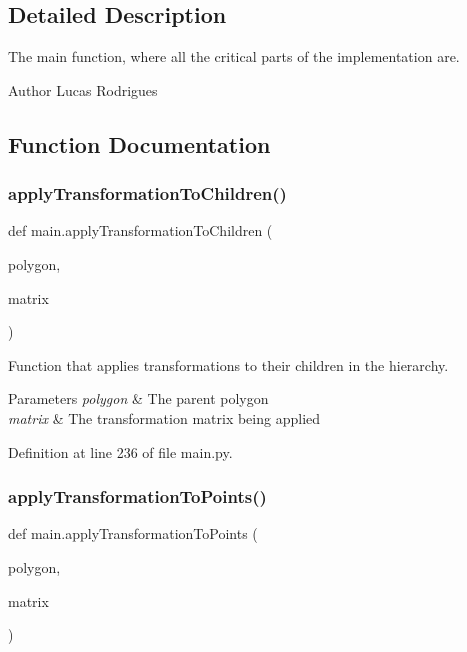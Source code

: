 \subsection{Detailed Description}
The main function, where all the critical parts of the implementation are. 

\begin{DoxyAuthor}{Author}
Lucas Rodrigues 
\end{DoxyAuthor}


\subsection{Function Documentation}
\mbox{\label{namespacemain_aeae47c61066756f699b19bf97f937370}} 
\subsubsection{\texorpdfstring{apply\+Transformation\+To\+Children()}{applyTransformationToChildren()}}
{\footnotesize\ttfamily def main.\+apply\+Transformation\+To\+Children (\begin{DoxyParamCaption}\item[{}]{polygon,  }\item[{}]{matrix }\end{DoxyParamCaption})}



Function that applies transformations to their children in the hierarchy. 


\begin{DoxyParams}{Parameters}
{\em polygon} & The parent polygon \\
\hline
{\em matrix} & The transformation matrix being applied \\
\hline
\end{DoxyParams}


Definition at line 236 of file main.\+py.

\mbox{\label{namespacemain_a69cc12fb1c27fecdfcac61f5d4e917b9}} 
\subsubsection{\texorpdfstring{apply\+Transformation\+To\+Points()}{applyTransformationToPoints()}}
{\footnotesize\ttfamily def main.\+apply\+Transformation\+To\+Points (\begin{DoxyParamCaption}\item[{}]{polygon,  }\item[{}]{matrix }\end{DoxyParamCaption})}



